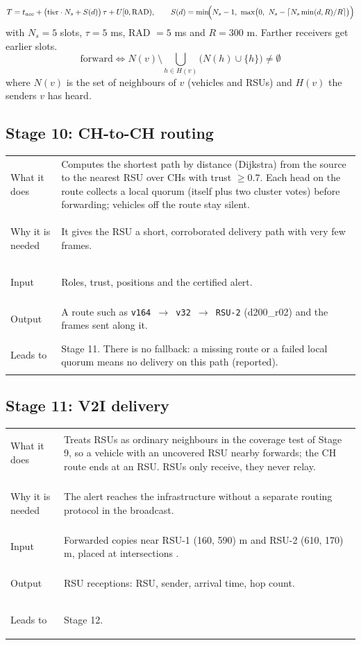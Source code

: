 \documentclass[11pt, a4paper]{article}
\makeatletter
\newcommand{\stage}[5]{%
  \par\noindent\begin{tabular}{@{}>{\bfseries\raggedright\arraybackslash}p{0.17\textwidth}p{0.79\textwidth}@{}}
  What it does & #1\\
  Why it is needed & #2\\
  Input & #3\\
  Output & #4\\
  Leads to & #5\\
  \end{tabular}\par\vspace{4pt}}
\makeatother
\begin{document}
\begin{equation}
T = t_{acc} + \bigl(\mathrm{tier}\cdot N_s + S(d)\bigr)\,\tau + U[0,\mathrm{RAD}), \qquad
S(d) = \min\!\Bigl(N_s-1,\ \max\bigl(0,\ N_s - \lceil N_s \min(d,R)/R \rceil \bigr)\Bigr)
\label{eq:timer}
\end{equation}
with $N_s = 5$ slots, $\tau = 5$ ms, RAD $= 5$ ms and $R = 300$ m. Farther receivers get earlier slots.
\begin{equation}
\text{forward} \iff N(v) \setminus \bigcup_{h \in H(v)} \bigl(N(h) \cup \{h\}\bigr) \neq \emptyset
\label{eq:cover}
\end{equation}
where $N(v)$ is the set of neighbours of $v$ (vehicles and RSUs) and $H(v)$ the senders $v$ has heard.

\subsection{Stage 10: CH-to-CH routing}
\stage{Computes the shortest path by distance (Dijkstra) from the source to the nearest RSU over CHs with trust
$\geq 0.7$. Each head on the route collects a local quorum (itself plus two cluster votes) before forwarding; vehicles off
the route stay silent.}
{It gives the RSU a short, corroborated delivery path with very few frames.}
{Roles, trust, positions and the certified alert.}
{A route such as \texttt{v164 $\rightarrow$ v32 $\rightarrow$ RSU-2} (d200\_r02) and the frames sent along it.}
{Stage 11. There is no fallback: a missing route or a failed local quorum means no delivery on this path (reported).}

\subsection{Stage 11: V2I delivery}
\stage{Treats RSUs as ordinary neighbours in the coverage test of Stage 9, so a vehicle with an uncovered RSU nearby
forwards; the CH route ends at an RSU. RSUs only receive, they never relay.}
{The alert reaches the infrastructure without a separate routing protocol in the broadcast.}
{Forwarded copies near RSU-1 (160, 590) m and RSU-2 (610, 170) m, placed at intersections \cite{trullols2010rsu}.}
{RSU receptions: RSU, sender, arrival time, hop count.}
{Stage 12.}
\end{document}
